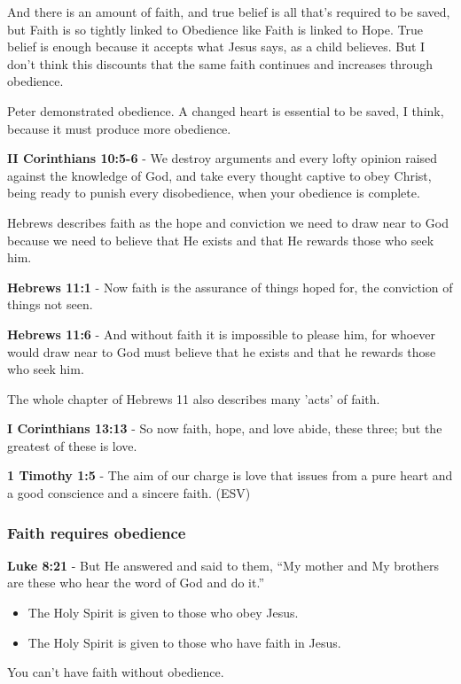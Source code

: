 \documentclass[11pt]{article}
\begin{document}
And there is an amount of faith, and true belief is all that's required to be saved, but Faith is so tightly linked to Obedience like Faith is linked to Hope. True belief is enough because it accepts what Jesus says, as a child believes. But I don't think this discounts that the same faith continues and increases through obedience.

Peter demonstrated obedience. A changed heart is essential to be saved, I think, because it must produce more obedience.

\textbf{II Corinthians 10:5-6} - We destroy arguments and every lofty opinion raised against the knowledge of God, and take every thought captive to obey Christ, being ready to punish every disobedience, when your obedience is complete.

Hebrews describes faith as the hope and conviction we need to draw near to God because we need to believe that He exists and that He rewards those who seek him.

\textbf{Hebrews 11:1} - Now faith is the assurance of things hoped for, the conviction of things not seen.

\textbf{Hebrews 11:6} - And without faith it is impossible to please him, for whoever would draw near to God must believe that he exists and that he rewards those who seek him.

The whole chapter of Hebrews 11 also describes many 'acts' of faith.

\textbf{I Corinthians 13:13} - So now faith, hope, and love abide, these three; but the greatest of these is love.

\textbf{1 Timothy 1:5} -  The aim of our charge is love that issues from a pure heart and a good conscience and a sincere faith.  (ESV)

\subsubsection{Faith requires obedience}
\label{sec:org2c5f835}
\textbf{Luke 8:21} - But He answered and said to them, “My mother and My brothers are these who hear the word of God and do it.”

\begin{itemize}
\item The Holy Spirit is given to those who obey Jesus.
\item The Holy Spirit is given to those who have faith in Jesus.
\end{itemize}

You can't have faith without obedience.
\end{document}
